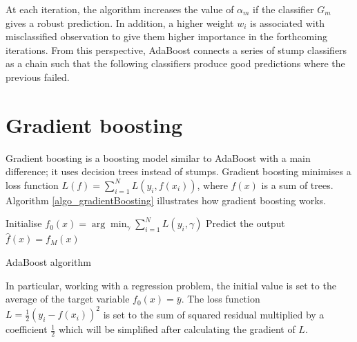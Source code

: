 At each iteration, the algorithm increases the value of $\alpha_m$ if the classifier $G_m$ gives a robust prediction. In addition, a higher weight $w_i$ is associated with misclassified observation to give them higher importance in the forthcoming iterations. From this perspective, AdaBoost connects a series of stump classifiers as a chain such that the following classifiers produce good predictions where the previous failed.

\section{Gradient boosting}
Gradient boosting is a boosting model similar to AdaBoost with a main difference; it uses decision trees instead of stumps. Gradient boosting minimises a loss function $L\left(f\right)=\sum_{i=1}^{N}L\left(y_i,f\left(x_i\right)\right)$,  where $f(x)$ is a sum of trees. Algorithm \ref{algo_gradientBoosting} illustrates how gradient boosting works.


\begin{algorithm}[H]
\DontPrintSemicolon
\SetAlgoLined

    Initialise $f_0\left(x\right)=\arg{\min_\gamma{\sum_{i=1}^{N}L\left(y_i,\gamma\right)}}$ \;
    Predict the output $\hat{f}\left(x\right)=f_M(x)$ \; 

\caption{AdaBoost algorithm}
\label{algo_gradientBoosting}
\end{algorithm}

In particular, working with a regression problem, the initial value is set to the average of the target variable $f_0\left(x\right)=\bar{y}$. The loss function $L=\frac{1}{2}\left(y_i-f\left(x_i\right)\right)^2$ is set to the sum of squared residual multiplied by a coefficient $\frac{1}{2}$ which will be simplified after calculating the gradient of $L$. \par

